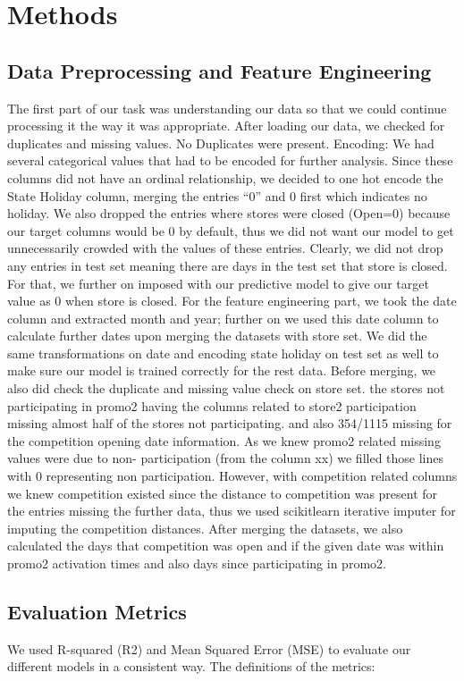 \documentclass[12pt]{report}
\begin{document}
\chapter{Methods}
\section{Data Preprocessing and Feature Engineering}
The first part of our task was understanding our data so that we could continue processing it the way it was appropriate. After loading our data, we checked for duplicates and missing values. No Duplicates were present.
Encoding: We had several categorical values that had to be encoded for further analysis. Since these columns did not have an ordinal relationship, we decided to one hot encode the State Holiday column, merging the entries “0” and 0 first which indicates no holiday.
We also dropped the entries where stores were closed (Open=0) because our target columns would be 0 by default, thus we did not want our model to get unnecessarily crowded with the values of these entries. Clearly, we did not drop any entries in test set meaning there are days in the test set that store is closed. For that, we further on imposed with our predictive model to give our target value as 0 when store is closed.
For the feature engineering part, we took the date column and extracted month and year; further on we used this date column to calculate further dates upon merging the datasets with store set.
We did the same transformations on date and encoding state holiday on test set as well to make sure our model is trained correctly for the rest data.
Before merging, we also did check the duplicate and missing value check on store set. the stores not participating in promo2 having the columns related to store2 participation missing almost half of the stores not participating. and also 354/1115 missing for the competition opening date information.
As we knew promo2 related missing values were due to non- participation (from the column xx) we filled those lines with 0 representing non participation.
However, with competition related columns we knew competition existed since the distance to competition was present for the entries missing the further data, thus we used scikitlearn iterative imputer for imputing the competition distances.
After merging the datasets, we also calculated the days that competition was open and if the given date was within promo2 activation times and also days since participating in promo2.

\section{Evaluation Metrics}
We used R-squared (R2) and Mean Squared Error (MSE) to evaluate our different models in a consistent way. The definitions of the metrics:
\end{document}
